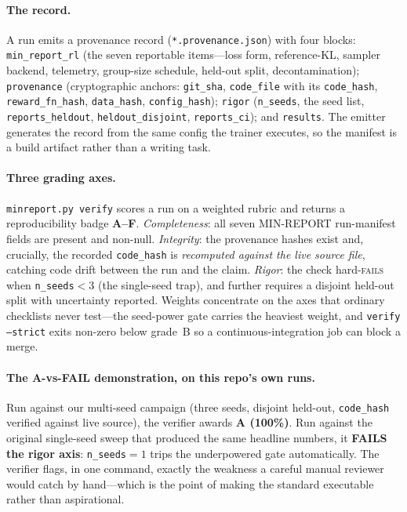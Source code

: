\documentclass{article}  \usepackage[preprint,nonatbib]{neurips_2026} \usepackage[numbers]{natbib}
\begin{document}
\paragraph{The record.} A run emits a provenance record
(\texttt{*.provenance.json}) with four blocks: \texttt{min\_report\_rl} (the
seven reportable items---loss form, reference-KL, sampler backend, telemetry,
group-size schedule, held-out split, decontamination); \texttt{provenance}
(cryptographic anchors: \texttt{git\_sha}, \texttt{code\_file} with its
\texttt{code\_hash}, \texttt{reward\_fn\_hash}, \texttt{data\_hash},
\texttt{config\_hash}); \texttt{rigor} (\texttt{n\_seeds}, the seed list,
\texttt{reports\_heldout}, \texttt{heldout\_disjoint}, \texttt{reports\_ci});
and \texttt{results}. The emitter generates the record from the same config the
trainer executes, so the manifest is a build artifact rather than a writing
task.

\paragraph{Three grading axes.} \texttt{minreport.py verify} scores a run on a
weighted rubric and returns a reproducibility badge \textbf{A--F}.
\emph{Completeness}: all seven MIN-REPORT run-manifest fields are present and non-null.
\emph{Integrity}: the provenance hashes exist and, crucially, the recorded
\texttt{code\_hash} is \emph{recomputed against the live source file}, catching
code drift between the run and the claim. \emph{Rigor}: the check hard-\textsc{fails}
when \texttt{n\_seeds}${}<3$ (the single-seed trap), and further requires a
disjoint held-out split with uncertainty reported. Weights concentrate on the
axes that ordinary checklists never test---the seed-power gate carries the
heaviest weight, and \texttt{verify --strict} exits non-zero below grade~B so a
continuous-integration job can block a merge.

\paragraph{The A-vs-FAIL demonstration, on this repo's own runs.} Run against
our multi-seed campaign (three seeds, disjoint held-out, \texttt{code\_hash}
verified against live source), the verifier awards \textbf{A (100\%)}. Run
against the original single-seed sweep that produced the same headline numbers,
it \textbf{FAILS the rigor axis}: \texttt{n\_seeds}${}=1$ trips the underpowered
gate automatically. The verifier flags, in one command, exactly the weakness a
careful manual reviewer would catch by hand---which is the point of making the
standard executable rather than aspirational.
\end{document}
